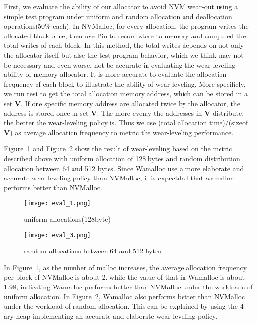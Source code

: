 \documentclass{vldb}
\begin{document}
First, we evaluate the ability of our allocator to avoid NVM wear-out using a simple test program under uniform and random allocation and deallocation operations(50\% each).
In NVMalloc, for every allocation, the program writes the allocated block once, then use Pin\cite{luk2005pin} to record store to memory and compared the total writes of each block.
In this method, the total writes depends on not only the allocator itself but alse the test program behavior,
which we think may not be necessary and even worse, not be accurate in evaluating the wear-leveling ability of memory allocator.
It is more accurate to evaluate the allocation frequency of each block to illustrate the ability of wear-leveling.
More specificly, we run test to get the total allocation memory address, which can be stored in a set \textbf{V}.
If one specific memory address are allocated twice by the allocator, the address is stored once in set \textbf{V}.
The more evenly the addresses in \textbf{V} distribute, the better the wear-leveling policy is.
Thus we use (total allocation time)/(sizeof \textbf{V}) as average allocation frequency to metric the wear-leveling performance.

Figure~\ref{fig:eval_1} and Figure~\ref{fig:eval_3} show the result of wear-leveling based on the metric described above with uniform allocation of 128 bytes and random distribution allocation between 64 and 512 bytes.
Since Wamalloc use a more elaborate and accurate wear-leveling policy than NVMalloc,
it is expectded that wamalloc performs better than NVMalloc.

\begin{figure}[ht]
\centering
\texttt{[image: eval\_1.png]}
\caption{uniform allocations(128byte)}
\label{fig:eval_1}
\end{figure}

\begin{figure}[ht]
\centering
\texttt{[image: eval\_3.png]}
\caption{random allocations between 64 and 512 bytes}
\label{fig:eval_3}
\end{figure}

In Figure~\ref{fig:eval_1}, as the number of malloc increases,
the average allocation frequency per block of NVMalloc is about 2.
while the value of that in Wamalloc is about 1.98, 
indicating Wamalloc performs better than NVMalloc under the workloads of uniform allocation.
In Figure~\ref{fig:eval_3},
Wamalloc also performs better than NVMalloc under the workload of random allocation.
This can be explained by using the 4-ary heap implementing an accurate and elaborate wear-leveling policy.
\end{document}
